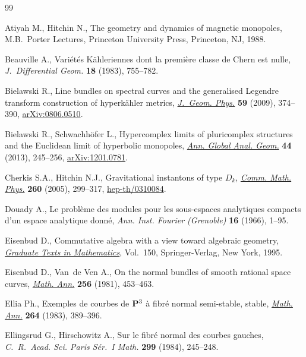 \documentclass[pdftex]{sigma}
\numberwithin{equation}{section}
\begin{document}
\begin{thebibliography}{99}
\footnotesize\itemsep=0pt

Atiyah M., Hitchin N., The geometry and dynamics of magnetic monopoles,
  M.B.~Porter Lectures, Princeton University Press, Princeton, NJ, 1988.

Beauville A., Vari\'et\'es {K}\"ahleriennes dont la premi\`ere classe de
  {C}hern est nulle, \textit{J.~Differential Geom.} \textbf{18} (1983),
  755--782.

Bielawski R., Line bundles on spectral curves and the generalised {L}egendre
  transform construction of hyperk\"ahler metrics, \href{http://dx.doi.org/10.1016/j.geomphys.2008.11.010}{\textit{J.~Geom. Phys.}}
  \textbf{59} (2009), 374--390, \href{http://arxiv.org/abs/0806.0510}{arXiv:0806.0510}.

Bielawski R., Schwachh{\"o}fer L., Hypercomplex limits of pluricomplex
  structures and the {E}uclidean limit of hyperbolic monopoles, \href{http://dx.doi.org/10.1007/s10455-013-9364-2}{\textit{Ann.
  Global Anal. Geom.}} \textbf{44} (2013), 245--256, \href{http://arxiv.org/abs/1201.0781}{arXiv:1201.0781}.

Cherkis S.A., Hitchin N.J., Gravitational instantons of type {$D_k$},
  \href{http://dx.doi.org/10.1007/s00220-005-1404-8}{\textit{Comm. Math. Phys.}} \textbf{260} (2005), 299--317,
  \href{http://arxiv.org/abs/hep-th/0310084}{hep-th/0310084}.

Douady A., Le probl\`eme des modules pour les sous-espaces analytiques compacts
  d'un espace analytique donn\'e, \textit{Ann. Inst. Fourier (Grenoble)}
  \textbf{16} (1966), 1--95.

Eisenbud D., Commutative algebra with a view toward algebraic geometry,
  \href{http://dx.doi.org/10.1007/978-1-4612-5350-1}{\textit{Graduate Texts in Mathematics}}, Vol.~150, Springer-Verlag, New York,
  1995.

Eisenbud D., Van~de Ven A., On the normal bundles of smooth rational space
  curves, \href{http://dx.doi.org/10.1007/BF01450541}{\textit{Math. Ann.}} \textbf{256} (1981), 453--463.

Ellia Ph., Exemples de courbes de {${\bf P}^{3}$} \`a f\/ibr\'e normal
  semi-stable, stable, \href{http://dx.doi.org/10.1007/BF01459132}{\textit{Math. Ann.}} \textbf{264} (1983), 389--396.

Ellingsrud G., Hirschowitz A., Sur le f\/ibr\'e normal des courbes gauches,
  \textit{C.~R.~Acad. Sci. Paris S\'er.~I Math.} \textbf{299} (1984), 245--248.


\end{thebibliography}
\end{document}
